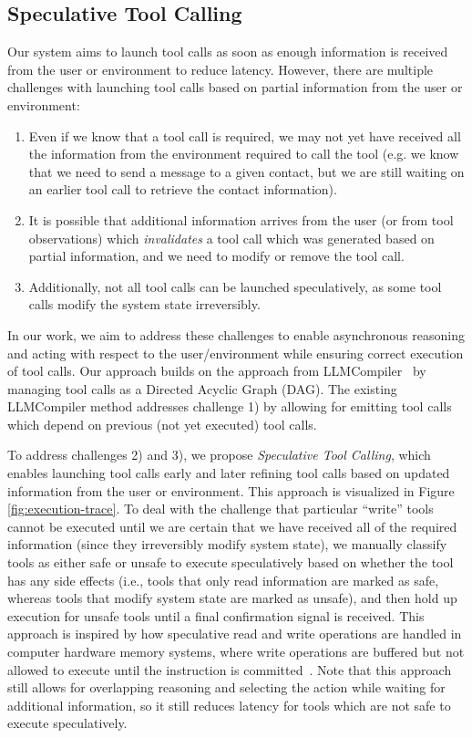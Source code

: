 \subsection{Speculative Tool Calling}
\label{sec:spec-tool-calling}

Our system aims to launch tool calls as soon as enough information is received from the user or environment to reduce latency. However, there are multiple challenges with launching tool calls based on partial information from the user or environment:

\begin{enumerate}
    \item Even if we know that a tool call is required, we may not yet have received all the information from the environment required to call the tool (e.g. we know that we need to send a message to a given contact, but we are still waiting on an earlier tool call to retrieve the contact information).
    \item It is possible that additional information arrives from the user (or from tool observations) which \emph{invalidates} a tool call which was generated based on partial information, and we need to modify or remove the tool call.
    \item Additionally, not all tool calls can be launched speculatively, as some tool calls modify the system state irreversibly.
\end{enumerate}

In our work, we aim to address these challenges to enable asynchronous reasoning and acting with respect to the user/environment while ensuring correct execution of tool calls.
Our approach builds on the approach from LLMCompiler~\citep{kim2024llm} by managing tool calls as a Directed Acyclic Graph (DAG). 
The existing LLMCompiler method addresses challenge 1) by allowing for emitting tool calls which depend on previous (not yet executed) tool calls. 

To address challenges 2) and 3), we propose \textit{Speculative Tool Calling}, which enables launching tool calls early and later refining tool calls based on updated information from the user or environment.
This approach is visualized in Figure \ref{fig:execution-trace}.
To deal with the challenge that particular ``write'' tools cannot be executed until we are certain that we have received all of the required information (since they irreversibly modify system state), we manually classify tools as either safe or unsafe to execute speculatively based on whether the tool has any side effects (i.e., tools that only read information are marked as safe, whereas tools that modify system state are marked as unsafe), and then hold up execution for unsafe tools until a final confirmation signal is received.
This approach is inspired by how speculative read and write operations are handled in computer hardware memory systems, where write operations are buffered but not allowed to execute until the instruction is committed~\citep{yeager2002mips}. 
Note that this approach still allows for overlapping reasoning and selecting the action while waiting for additional information, so it still reduces latency for tools which are not safe to execute speculatively.

